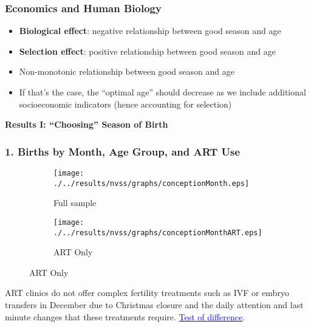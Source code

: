 \documentclass[10pt,letterpaper,subeqn]{beamer}
\begin{document}
\begin{frame}
\frametitle{Economics and Human Biology}
\begin{itemize}
\item \textbf{Biological effect}: negative relationship between good season and age
\item \textbf{Selection effect}: positive relationship between good season and age
\item Non-monotonic relationship between good season and age
\item If that's the case, the ``optimal age'' should decrease as we include additional socioeconomic indicators (hence accounting for selection)
\end{itemize}
\end{frame}

\begin{frame}
  \begin{center}
    \textbf{Results I: ``Choosing'' Season of Birth}
  \end{center}
\end{frame}


\begin{frame}[label=MainDiff]
\frametitle{1. Births by Month, Age Group, and ART Use}
\begin{figure}[htpb!]
\begin{center}
\caption{Birth Prevalence by Month, Age Group, and ART Usage}
\label{bqFig:concepMonth}
\begin{subfigure}{.5\textwidth}
  \centering
  \texttt{[image: ./../results/nvss/graphs/conceptionMonth.eps]}
  \caption{Full sample}
  \label{fig:concepAbs}
\end{subfigure}%
\begin{subfigure}{.5\textwidth}
  \centering
  \texttt{[image: ./../results/nvss/graphs/conceptionMonthART.eps]}
  \caption{ART Only}
  \label{fig:concepAbsART}
\end{subfigure}
\end{center}
\end{figure}
ART clinics do not offer complex fertility treatments such as IVF or embryo transfers in December due to Christmas closure and the daily attention and last minute changes that these treatments require. \hyperlink{Diff}{\textcolor{blue}{Test of difference}}.
\end{frame}
\end{document}

